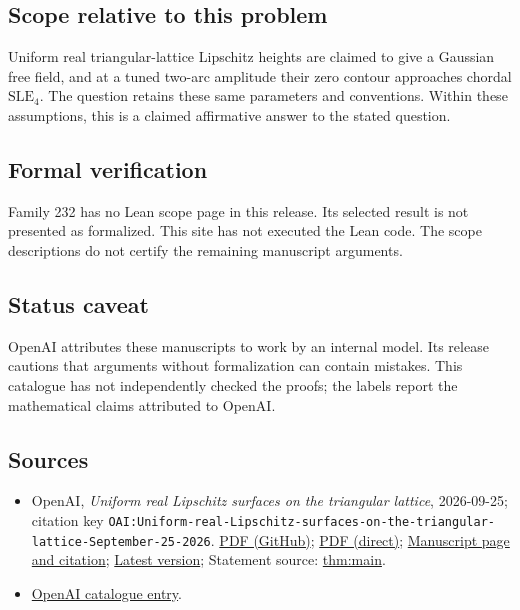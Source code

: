 \documentclass[11pt]{article}
\begin{document}
\subsection{Scope relative to this problem}
Uniform real triangular-lattice Lipschitz heights are claimed to give a Gaussian free field, and at a tuned two-arc amplitude their zero contour approaches chordal $\mathrm{SLE}_4$. The question retains these same parameters and conventions. Within these assumptions, this is a claimed affirmative answer to the stated question.

\subsection{Formal verification}
Family 232 has no Lean scope page in this release. Its selected result is not presented as formalized. This site has not executed the Lean code. The scope descriptions do not certify the remaining manuscript arguments.

\subsection{Status caveat}
OpenAI attributes these manuscripts to work by an internal model. Its release cautions that arguments without formalization can contain mistakes. This catalogue has not independently checked the proofs; the labels report the mathematical claims attributed to OpenAI.

\subsection{Sources}
\begin{itemize}
\item OpenAI, \emph{Uniform real Lipschitz surfaces on the triangular lattice}, 2026-09-25; citation key \texttt{OAI:Uniform-real-Lipschitz-surfaces-on-the-triangular-lattice-September-25-2026}. \href{https://github.com/openai/math/blob/adc7f1241b42e322a6451854ab7e4b4c146bf78a/preprints/Uniform-real-Lipschitz-surfaces-on-the-triangular-lattice-September-25-2026/paper.pdf}{PDF (GitHub)}; \href{https://github.com/openai/math/raw/adc7f1241b42e322a6451854ab7e4b4c146bf78a/preprints/Uniform-real-Lipschitz-surfaces-on-the-triangular-lattice-September-25-2026/paper.pdf}{PDF (direct)}; \href{https://github.com/openai/math/blob/adc7f1241b42e322a6451854ab7e4b4c146bf78a/preprints/Uniform-real-Lipschitz-surfaces-on-the-triangular-lattice-September-25-2026/README.md}{Manuscript page and citation}; \href{https://github.com/openai/math/blob/main/preprints/Uniform-real-Lipschitz-surfaces-on-the-triangular-lattice-September-25-2026/paper.pdf}{Latest version}; Statement source: \href{https://github.com/openai/math/blob/adc7f1241b42e322a6451854ab7e4b4c146bf78a/preprints/Uniform-real-Lipschitz-surfaces-on-the-triangular-lattice-September-25-2026/build/paper.tex\#L101}{thm:main}.
\item \href{https://github.com/openai/math/blob/adc7f1241b42e322a6451854ab7e4b4c146bf78a/CONTENTS.md}{OpenAI catalogue entry}.
\end{itemize}
\end{document}
